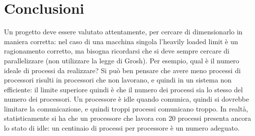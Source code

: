 \section{Conclusioni}
Un progetto deve essere valutato attentamente, per cercare di dimensionarlo in maniera corretta: nel caso di una
macchina singola l'heavily loaded limit è un ragionamento corretto, ma bisogna ricordarsi che si deve sempre cercare di
parallelizzare (non utilizzare la legge di Grosh). Per esempio, qual è il numero ideale di processi da realizzare? Si
può ben pensare che avere meno processi di processori risulti in processori che non lavorano, e quindi in un sistema
non efficiente: il limite superiore quindi è che il numero dei processi sia lo stesso del numero dei processori. Un
processore è idle quando comunica, quindi si dovrebbe limitare la comunicazione, e quindi troppi processi comunicano
troppo.
In realtà, statisticamente si ha che un processore che lavora con 20 processi presenta ancora lo stato di idle: un
centinaio di processi per processore è un numero adeguato.
